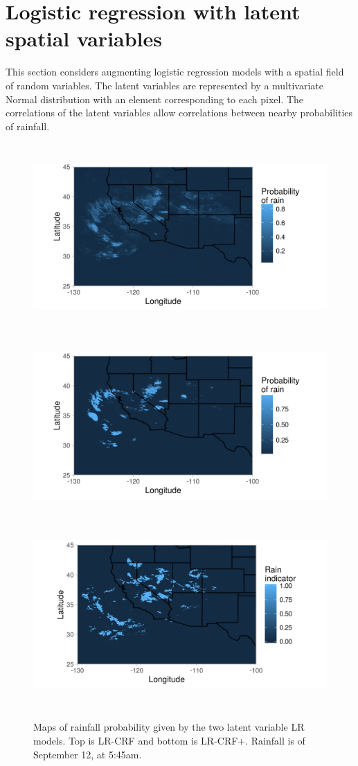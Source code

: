 \section{Logistic regression with latent spatial variables}

This section considers augmenting logistic regression models with a spatial field of random variables. The latent variables are represented by a multivariate Normal distribution with an element corresponding to each pixel. The correlations of the latent variables allow correlations between nearby probabilities of rainfall.

\begin{figure}[t!]
\centering
\includegraphics[height=2.8in]{./R/prec.png}
\includegraphics[height=2.8in]{./R/prec_w.png}
\includegraphics[height=2.8in]{./R/prec_t.png}
\caption{Maps of rainfall probability given by the two latent variable LR models. Top is LR-CRF and bottom is LR-CRF+. Rainfall is of September 12, at 5:45am.}

\label{probprec}
\end{figure}


